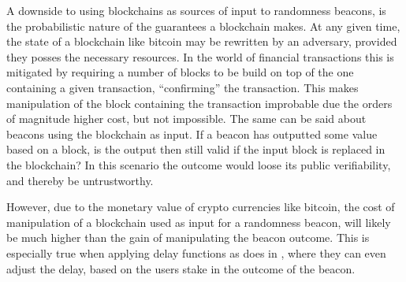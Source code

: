 A downside to using blockchains as sources of input to randomness beacons, is the probabilistic nature of the guarantees a blockchain makes.
At any given time, the state of a blockchain like bitcoin may be rewritten by an adversary, provided they posses the necessary resources.
In the world of financial transactions this is mitigated by requiring a number of blocks to be build on top of the one containing a given transaction, \enquote{confirming} the transaction.
This makes manipulation of the block containing the transaction improbable due the orders of magnitude higher cost, but not impossible.
The same can be said about beacons using the blockchain as input.
If a beacon has outputted some value based on a block, is the output then still valid if the input block is replaced in the blockchain?
In this scenario the outcome would loose its public verifiability, and thereby be untrustworthy.

However, due to the monetary value of crypto currencies like bitcoin, the cost of manipulation of a blockchain used as input for a randomness beacon, will likely be much higher than the gain of manipulating the beacon outcome.
This is especially true when applying delay functions as \citet{bunz2017proofsof} does in , where they can even adjust the delay, based on the users stake in the outcome of the beacon.

